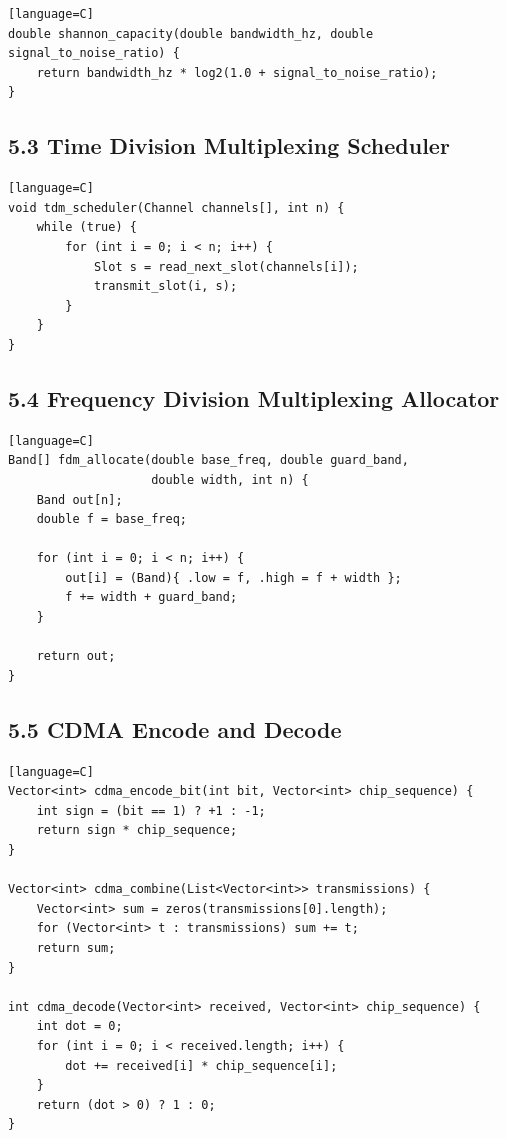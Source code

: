 \documentclass[11pt]{article}
\begin{document}
\begin{verbatim}[language=C]
double shannon_capacity(double bandwidth_hz, double signal_to_noise_ratio) {
    return bandwidth_hz * log2(1.0 + signal_to_noise_ratio);
}
\end{verbatim}

\subsection{5.3 Time Division Multiplexing
Scheduler}\label{time-division-multiplexing-scheduler}

\begin{verbatim}[language=C]
void tdm_scheduler(Channel channels[], int n) {
    while (true) {
        for (int i = 0; i < n; i++) {
            Slot s = read_next_slot(channels[i]);
            transmit_slot(i, s);
        }
    }
}
\end{verbatim}

\subsection{5.4 Frequency Division Multiplexing
Allocator}\label{frequency-division-multiplexing-allocator}

\begin{verbatim}[language=C]
Band[] fdm_allocate(double base_freq, double guard_band,
                    double width, int n) {
    Band out[n];
    double f = base_freq;

    for (int i = 0; i < n; i++) {
        out[i] = (Band){ .low = f, .high = f + width };
        f += width + guard_band;
    }

    return out;
}
\end{verbatim}

\subsection{5.5 CDMA Encode and Decode}\label{cdma-encode-and-decode}

\begin{verbatim}[language=C]
Vector<int> cdma_encode_bit(int bit, Vector<int> chip_sequence) {
    int sign = (bit == 1) ? +1 : -1;
    return sign * chip_sequence;
}

Vector<int> cdma_combine(List<Vector<int>> transmissions) {
    Vector<int> sum = zeros(transmissions[0].length);
    for (Vector<int> t : transmissions) sum += t;
    return sum;
}

int cdma_decode(Vector<int> received, Vector<int> chip_sequence) {
    int dot = 0;
    for (int i = 0; i < received.length; i++) {
        dot += received[i] * chip_sequence[i];
    }
    return (dot > 0) ? 1 : 0;
}
\end{verbatim}
\end{document}
